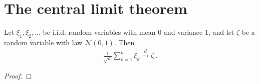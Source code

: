 \chapter{The central limit theorem}


\begin{theorem}\label{clt}
Let $\xi_1, \xi_2, \ldots$ be i.i.d. random variables with mean 0 and variance 1, and let $\zeta$ be a random variable with law $\mathcal N(0,1)$. Then
\begin{align*}
\frac{1}{\sqrt{n}}\sum_{k=1}^n \xi_k \xrightarrow{d} \zeta \: .
\end{align*}
\end{theorem}

\begin{proof}
\end{proof}
